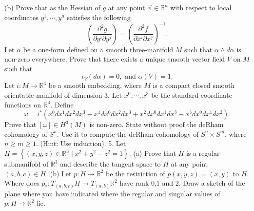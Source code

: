 \documentclass[10pt]{article}
\begin{document}
(b) Prove that as the Hessian of $g$ at any point $\vec{v} \in \mathbb{R}^{n}$ with respect to local coordinates $y^{1}, \cdots, y^{n}$ satisfies the following
$$
\left(\frac{\partial^{2} g}{\partial y^{i} \partial y^{j}}\right)=\left(\frac{\partial^{2} f}{\partial x^{i} \partial x^{j}}\right)^{-1} .
$$
\newpage
Let $\alpha$ be a one-form defined on a smooth three-manifold $M$ such that $\alpha \wedge d \alpha$ is non-zero everywhere.
Prove that there exists a unique smooth vector field $V$ on $M$ such that
$$
\iota_{V}(d \alpha)=0, \text { and } \alpha(V)=1 .
$$
\newpage
Let $i: M \rightarrow \mathbb{R}^{4}$ be a smooth embedding, where $M$ is a compact closed smooth orientable manifold of dimension 3. Let $x^{0}, \cdots, x^{3}$ be the standard coordinate functions on $\mathbb{R}^{4}$. Define
$$
\omega=i^{*}\left(x^{0} d x^{1} d x^{2} d x^{3}-x^{1} d x^{0} d x^{2} d x^{3}+x^{2} d x^{0} d x^{1} d x^{3}-x^{3} d x^{0} d x^{1} d x^{2}\right) .
$$
Prove that $[\omega] \in H^{3}(M)$ is non-zero.
\newpage
State without proof the deRham cohomology of $S^{n}$. Use it to compute the deRham cohomology of $S^{n} \times S^{m}$, where $n \geq m \geq 1$. (Hint: Use induction). 5. Let $H=\left\{(x, y, z) \in \mathbb{R}^{3} \mid x^{2}+y^{2}-z^{2}=1\right\}$.
(a) Prove that $H$ is a regular submanifold of $\mathbb{R}^{3}$ and describe the tangent space to $H$ at any point $(a, b, c) \in H$.
(b) Let $p: H \rightarrow \mathbb{R}^{2}$ be the restriction of $p(x, y, z)=(x, y)$ to $H$. Where does $p_{*}: T_{(a, b, c)} H \rightarrow T_{(a, b)} \mathbb{R}^{2}$ have rank 0,1 and 2. Draw a sketch of the plane where you have indicated where the regular and singular values of $p: H \rightarrow \mathbb{R}^{2}$ lie.
\newpage
\end{document}
